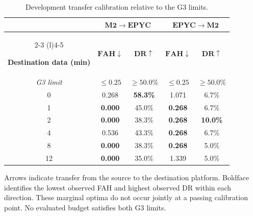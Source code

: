 \begin{table}[!t]
\centering
\caption{Development transfer calibration relative to the G3 limits.}
\label{tab:transfer_calibration}

{\scriptsize
\setlength{\tabcolsep}{3.1pt}
\renewcommand{\arraystretch}{1.03}

\begin{tabular}{@{}ccccc@{}}
\toprule
&
\multicolumn{2}{c}{\(\mathbf{M2\rightarrow EPYC}\)} &
\multicolumn{2}{c}{\(\mathbf{EPYC\rightarrow M2}\)} \\
\cmidrule(lr){2-3}
\cmidrule(l){4-5}

\textbf{Destination data (min)} &
\(\mathbf{FAH}\boldsymbol{\downarrow}\) &
\(\mathbf{DR}\boldsymbol{\uparrow}\) &
\(\mathbf{FAH}\boldsymbol{\downarrow}\) &
\(\mathbf{DR}\boldsymbol{\uparrow}\) \\
\midrule

\emph{G3 limit}
& \(\leq0.25\) & \(\geq50.0\%\)
& \(\leq0.25\) & \(\geq50.0\%\) \\

\midrule
0
& 0.268 & \textbf{58.3\%}
& 1.071 & 6.7\% \\

1
& \textbf{0.000} & 45.0\%
& \textbf{0.268} & 6.7\% \\

2
& \textbf{0.000} & 38.3\%
& \textbf{0.268} & \textbf{10.0\%} \\

4
& 0.536 & 43.3\%
& \textbf{0.268} & 6.7\% \\

8
& \textbf{0.000} & 38.3\%
& \textbf{0.268} & 5.0\% \\

12
& \textbf{0.000} & 35.0\%
& 1.339 & 5.0\% \\

\bottomrule
\end{tabular}
}

\vspace{2pt}
{\scriptsize\raggedright
Arrows indicate transfer from the source to the destination platform. Boldface identifies the lowest observed FAH and highest observed DR within each direction. These marginal optima do not occur jointly at a passing calibration point. No evaluated budget satisfies both G3 limits.
\par}
\end{table}
